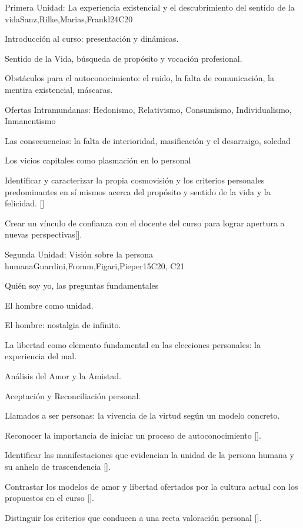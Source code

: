 \begin{syllabus}
\begin{unit}{}{Primera Unidad: La experiencia existencial y el descubrimiento del sentido de la vida}{Sanz,Rilke,Marias,Frankl}{24}{C20}
\begin{topics}
	\item Introducción al curso: presentación y dinámicas.
	\item Sentido de la Vida, búsqueda de propósito y vocación profesional.
	\item Obstáculos para el autoconocimiento: el ruido, la falta de comunicación, la mentira existencial, máscaras.
	\item Ofertas Intramundanas: Hedonismo, Relativismo, Consumismo, Individualismo, Inmanentismo
	\item Las consecuencias: la falta de interioridad, masificación y el desarraigo, soledad
	\item Los vicios capitales como plasmación en lo personal
\end{topics}
\begin{learningoutcomes}
	\item Identificar y caracterizar la propia cosmovisión y los criterios personales predominantes en sí­ mismos acerca del propósito y sentido de la vida y la felicidad. [\Usage]
	\item Crear un vínculo de confianza con el docente del curso para lograr apertura a nuevas perspectivas[\Usage].
\end{learningoutcomes}
\end{unit}

\begin{unit}{}{Segunda Unidad: Visión sobre la persona humana}{Guardini,Fromm,Figari,Pieper}{15}{C20, C21}
\begin{topics}
	\item Quién soy yo, las preguntas fundamentales
	\item El hombre como unidad.
	\item El hombre: nostalgia de infinito.
	\item La libertad como elemento fundamental en las elecciones personales: la experiencia del mal.
	\item Análisis del Amor y la Amistad.
	\item Aceptación y Reconciliación personal.
    \item Llamados a ser personas: la vivencia de la virtud según un modelo concreto.
\end{topics}
\begin{learningoutcomes}
	\item Reconocer la importancia de iniciar un proceso de autoconocimiento [\Usage].
	\item Identificar las manifestaciones que evidencian la unidad de la persona humana y su anhelo de trascendencia [\Usage].
    \item Contrastar los modelos de amor y libertad ofertados por la cultura actual con los propuestos en el curso [\Usage].
    \item Distinguir los criterios que conducen a una recta valoración personal [\Usage].
\end{learningoutcomes}
\end{unit}


\end{syllabus}
